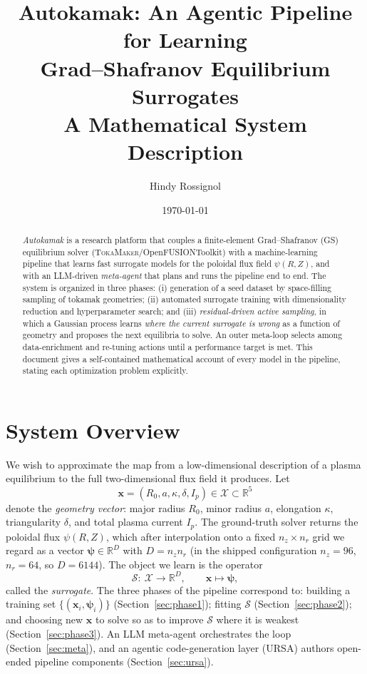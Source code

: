\documentclass[11pt]{article}
\title{\textbf{Autokamak}: An Agentic Pipeline for Learning\\
Grad--Shafranov Equilibrium Surrogates\\[0.3em]
\large A Mathematical System Description}
\author{Hindy Rossignol}
\date{\today}
\newcommand{\R}{\mathbb{R}}
\newcommand{\x}{\bm{x}}
\newcommand{\X}{\mathcal{X}}
\newcommand{\psiv}{\bm{\psi}}
\newcommand{\paramvec}{(R_0,a,\kappa,\delta,I_p)}
\begin{document}
\maketitle

\begin{abstract}
\noindent
\emph{Autokamak} is a research platform that couples a finite-element
Grad--Shafranov (GS) equilibrium solver (\textsc{TokaMaker}/OpenFUSIONToolkit)
with a machine-learning pipeline that learns fast surrogate models for the
poloidal flux field $\psi(R,Z)$, and with an LLM-driven \emph{meta-agent}
that plans and runs the pipeline end to end. The system is organized in three
phases: (i) generation of a seed dataset by space-filling sampling of tokamak
geometries; (ii) automated surrogate training with dimensionality reduction
and hyperparameter search; and (iii) \emph{residual-driven active sampling},
in which a Gaussian process learns \emph{where the current surrogate is wrong}
as a function of geometry and proposes the next equilibria to solve. An outer
meta-loop selects among data-enrichment and re-tuning actions until a
performance target is met. This document gives a self-contained mathematical
account of every model in the pipeline, stating each optimization problem
explicitly.
\end{abstract}

\tableofcontents

\section{System Overview}

We wish to approximate the map from a low-dimensional description of a plasma
equilibrium to the full two-dimensional flux field it produces. Let
\begin{equation}
  \x = \paramvec \in \X \subset \R^5
\end{equation}
denote the \emph{geometry vector}: major radius $R_0$, minor radius $a$,
elongation $\kappa$, triangularity $\delta$, and total plasma current $I_p$.
The ground-truth solver returns the poloidal flux $\psi(R,Z)$, which after
interpolation onto a fixed $n_z\times n_r$ grid we regard as a vector
$\psiv \in \R^{D}$ with $D = n_z n_r$ (in the shipped configuration
$n_z=96$, $n_r=64$, so $D=6144$). The object we learn is the operator
\begin{equation}
  \mathcal{S}:\ \X \to \R^{D}, \qquad \x \mapsto \psiv,
\end{equation}
called the \emph{surrogate}. The three phases of the pipeline correspond to:
building a training set $\{(\x_i,\psiv_i)\}$ (Section~\ref{sec:phase1}); fitting
$\mathcal{S}$ (Section~\ref{sec:phase2}); and choosing new $\x$ to solve so as
to improve $\mathcal{S}$ where it is weakest (Section~\ref{sec:phase3}). An
LLM meta-agent orchestrates the loop (Section~\ref{sec:meta}), and an agentic
code-generation layer (URSA) authors open-ended pipeline components
(Section~\ref{sec:ursa}).
\end{document}
